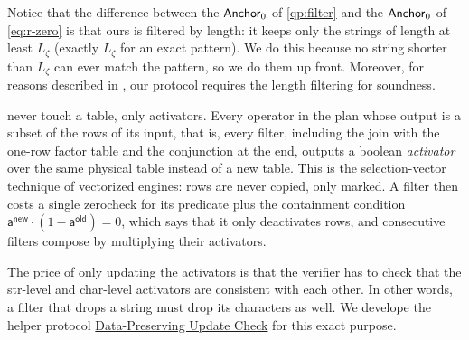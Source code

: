  Notice that the difference between the $\mathsf{Anchor}_{0}$ of \cref{qp:filter} and the $\mathsf{Anchor}_{0}$ of \cref{eq:r-zero} is that ours is filtered by length: it keeps only the strings of length at least $L_\zeta$ (exactly $L_\zeta$ for an exact pattern). We do this because no string shorter than $L_\zeta$ can ever match the pattern, so we do them up front. Moreover, for reasons described in \XXX, our protocol requires the length filtering for soundness.

  never touch a table, only activators. Every operator in the plan whose output is a subset of the rows of its input, that is, every filter, including the join with the one-row factor table and the conjunction at the end, outputs a boolean \emph{activator} over the same physical table instead of a new table. This is the selection-vector technique of vectorized engines: rows are never copied, only marked. A filter then costs a single zerocheck for its predicate plus the containment condition $\mathsf{a}^{\mathsf{new}}\cdot(1-\mathsf{a}^{\mathsf{old}})=0$, which says that it only deactivates rows, and consecutive filters compose by multiplying their activators.

 The price of only updating the activators is that the verifier has to check that the str-level and char-level activators are consistent with each other. In other words, a filter that drops a string must drop its characters as well. We develope the helper protocol \hyperref[{piop:data-preserving-update-check}]{Data-Preserving Update Check} for this exact purpose.



